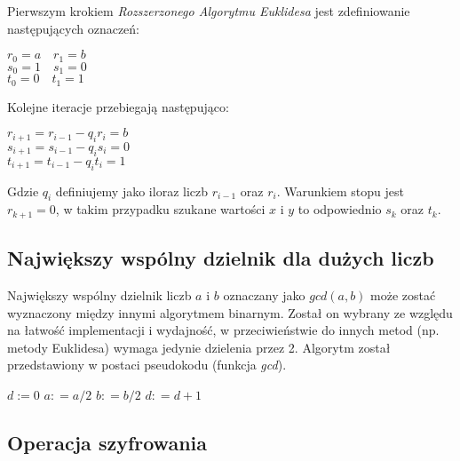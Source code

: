 \documentclass[10pt,a4paper]{article}
\begin{document}
Pierwszym krokiem \textit{Rozszerzonego Algorytmu Euklidesa} jest zdefiniowanie następujących oznaczeń:

\begin{center}
$r_{0} = a \quad r_{1} = b$\\
$s_{0} = 1 \quad s_{1} = 0$\\
$t_{0} = 0 \quad t_{1} = 1$
\end{center}

Kolejne iteracje przebiegają następująco:

\begin{center}
$r_{i+1} = r_{i-1} - q_{i} r_{i} = b$\\
$s_{i+1} = s_{i-1} - q_{i} s_{i} = 0$\\
$t_{i+1} = t_{i-1} - q_{i} t_{i} = 1$
\end{center}

Gdzie $q_i$ definiujemy jako iloraz liczb $r_{i-1}$ oraz $r_i$. Warunkiem stopu jest $r_{k+1} = 0$, w takim przypadku szukane wartości $x$ i $y$ to odpowiednio $s_k$ oraz $t_k$. 
 
\subsection{Największy wspólny dzielnik dla dużych liczb}
Największy wspólny dzielnik liczb $a$ i $b$ oznaczany jako $gcd(a,b)$ może zostać wyznaczony między innymi algorytmem binarnym. Został on wybrany ze względu na łatwość implementacji i wydajność, w przeciwieństwie do innych metod (np. metody Euklidesa) wymaga jedynie dzielenia przez 2. Algorytm został przedstawiony w postaci pseudokodu (funkcja \textit{gcd}).

\begin{algorithm} \label{fun_gcd}
\begin{algorithmic}[1]
\State $d := 0$
	\State $a : =a/2$
	\State $b : =b/2$
	\State $d : = d + 1$
\EndWhile

	   
	   
	  
	 \Else {}
	 \EndIf
\EndWhile

\State {}
\EndFunction
\end{algorithmic}
\end{algorithm}


\subsection{Operacja szyfrowania}
\end{document}
